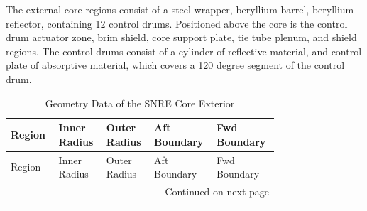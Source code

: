 \documentclass[8pt,a4paper]{article}
\begin{document}
\justifying

The external core regions consist of a steel wrapper, beryllium barrel, beryllium
reflector, containing 12 control drums. Positioned above the core is the control
drum actuator zone, brim shield, core support plate, tie tube plenum, and shield
regions. The control drums consist of a cylinder of reflective material, and
control plate of absorptive material, which covers a 120 degree segment of the control drum.

\raggedright

\begin{longtable}{|m{0.15\linewidth}|m{0.15\linewidth}|m{0.15\linewidth}|m{0.15\linewidth}|m{0.15\linewidth}|}
    \caption{Geometry Data of the SNRE Core Exterior} \\
    
    \hline Region & Inner Radius & Outer Radius& Aft Boundary& Fwd Boundary\\\hline
    \endfirsthead
    
    
    \hline Region & Inner Radius & Outer Radius& Aft Boundary& Fwd Boundary\\\hline
    \endhead
    
    \hline \multicolumn{5}{|r|}{{Continued on next page}} \\ \hline
    \endfoot
    

\end{longtable}
\end{document}
